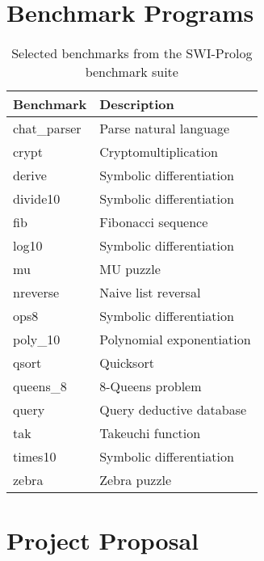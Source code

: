 \begin{appendices}
\chapter{Benchmark Programs}

\label{appendix:benchmarks}

\begin{table}[H]
\centering
\begin{tabular}{ll}
\hline
\textbf{Benchmark} & \textbf{Description} \\
\hline
chat\_parser & Parse natural language \\
crypt & Cryptomultiplication \\
derive & Symbolic differentiation \\
divide10 & Symbolic differentiation \\
fib & Fibonacci sequence \\
log10 & Symbolic differentiation \\
mu & MU puzzle \\
nreverse & Naive list reversal \\
ops8 & Symbolic differentiation \\
poly\_10 & Polynomial exponentiation \\
qsort & Quicksort \\
queens\_8 & 8-Queens problem \\
query & Query deductive database \\
tak & Takeuchi function \\
times10 & Symbolic differentiation \\
zebra & Zebra puzzle \\
\hline
\end{tabular}
\caption{Selected benchmarks from the SWI-Prolog benchmark suite}
\label{tab:benchmarks}
\end{table}

\chapter{Project Proposal}

\label{appendix:proposal}



\end{appendices}
